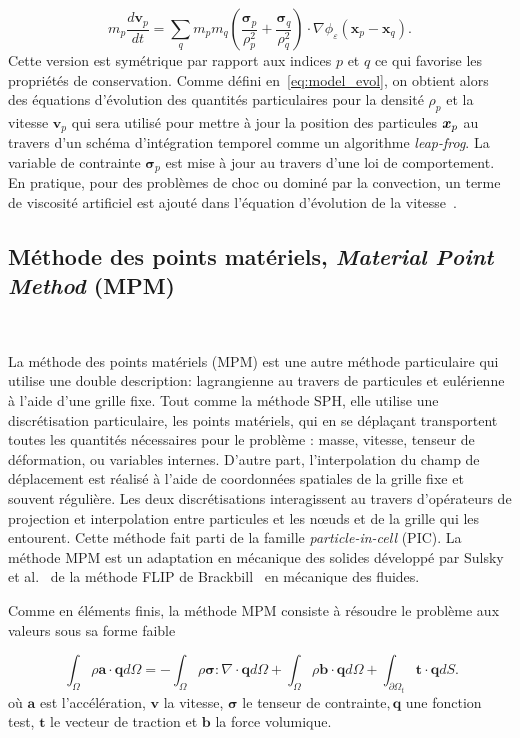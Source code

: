 \begin{equation*}
    m_p \frac{d \bm v_p}{dt} = \sum_{q} m_p m_q \left(\frac{\bm \sigma_p}{\rho_p^2} + \frac{\bm \sigma_q}{\rho_q^2} \right) \cdot \nabla \phi_\varepsilon(\bm x_p - \bm x_q).
\end{equation*}Cette version est symétrique par rapport aux indices $p$ et $q$ ce qui favorise les propriétés de conservation. Comme défini en~\eqref{eq:model_evol}, on obtient alors des équations d'évolution des quantités particulaires pour la densité $\rho_p$ et la vitesse $\bm v_p$ qui sera utilisé pour mettre à jour la position des particules $\bm{x}_p$ au travers d'un schéma d'intégration temporel comme un algorithme \textit{leap-frog}. La variable de contrainte $\bm \sigma_p$ est mise à jour au travers d'une loi de comportement. En pratique, pour des problèmes de choc ou dominé par la convection, un terme de viscosité artificiel est ajouté dans l'équation d'évolution de la vitesse~\cite{MONAGHAN1983374}.

\subsection{Méthode des points matériels, \textit{Material Point Method} (MPM)}~\label{sec:mpm}

La méthode des points matériels (MPM) est une autre méthode particulaire qui utilise une double description: lagrangienne au travers de particules et eulérienne à l'aide d'une grille fixe. Tout comme la méthode SPH, elle utilise une discrétisation particulaire, les points matériels, qui en se déplaçant transportent toutes les quantités nécessaires pour le problème : masse, vitesse, tenseur de déformation, ou variables internes. D'autre part, l'interpolation du champ de déplacement est réalisé à l'aide de coordonnées spatiales de la grille fixe et souvent régulière. Les deux discrétisations interagissent au travers d'opérateurs de projection et interpolation entre particules et les nœuds et de la grille qui les entourent. Cette méthode fait parti de la famille \textit{particle-in-cell} (PIC). La méthode MPM est un adaptation en mécanique des solides développé par Sulsky et al.~\cite{sulsky_particle_1994} de la méthode FLIP de Brackbill~\cite{brackbill_flip_1988} en mécanique des fluides.

Comme en éléments finis, la méthode MPM consiste à résoudre le problème aux valeurs sous sa forme faible

\begin{equation*}~\label{eq:form_faible}
    \int_\Omega \rho \bm a \cdot \bm q d\Omega = - \int_\Omega \rho \bm \sigma : \nabla \cdot \bm q d\Omega + \int_\Omega \rho \bm b\cdot \bm q d\Omega + \int_{\partial \Omega_t}  \bm t \cdot \bm q dS.
\end{equation*}où $\bm a$ est l'accélération, $\bm v$ la vitesse, $\bm \sigma$ le tenseur de contrainte$, \bm q$ une fonction test, $\bm t$ le vecteur de traction et $\bm b$ la force volumique.

